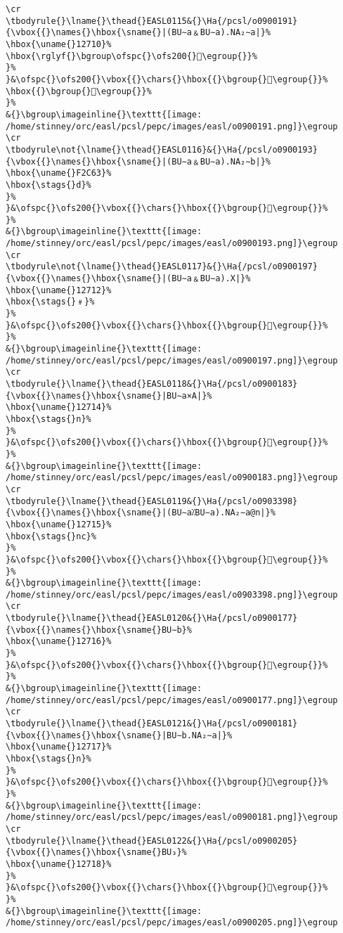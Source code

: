 \begin{verbatim}
\cr
\tbodyrule{}\lname{}\thead{}EASL0115&{}\Ha{/pcsl/o0900191}{\vbox{{}\names{}\hbox{\sname{}|(BU∼a﹠BU∼a).NA₂∼a|}%
\hbox{\uname{}12710}%
\hbox{\rglyf{}\bgroup\ofspc{}\ofs200{}𒜐\egroup{}}%
}%
}&\ofspc{}\ofs200{}\vbox{{}\chars{}\hbox{{}\bgroup{}𒜐\egroup{}}%
\hbox{{}\bgroup{}𒜑\egroup{}}%
}%
&{}\bgroup\imageinline{}\texttt{[image: /home/stinney/orc/easl/pcsl/pepc/images/easl/o0900191.png]}\egroup
\cr
\tbodyrule\not{\lname{}\thead{}EASL0116}&{}\Ha{/pcsl/o0900193}{\vbox{{}\names{}\hbox{\sname{}|(BU∼a﹠BU∼a).NA₂∼b|}%
\hbox{\uname{}F2C63}%
\hbox{\stags{}d}%
}%
}&\ofspc{}\ofs200{}\vbox{{}\chars{}\hbox{{}\bgroup{}󲱣\egroup{}}%
}%
&{}\bgroup\imageinline{}\texttt{[image: /home/stinney/orc/easl/pcsl/pepc/images/easl/o0900193.png]}\egroup
\cr
\tbodyrule\not{\lname{}\thead{}EASL0117}&{}\Ha{/pcsl/o0900197}{\vbox{{}\names{}\hbox{\sname{}|(BU∼a﹠BU∼a).X|}%
\hbox{\uname{}12712}%
\hbox{\stags{}﹟}%
}%
}&\ofspc{}\ofs200{}\vbox{{}\chars{}\hbox{{}\bgroup{}𒜒\egroup{}}%
}%
&{}\bgroup\imageinline{}\texttt{[image: /home/stinney/orc/easl/pcsl/pepc/images/easl/o0900197.png]}\egroup
\cr
\tbodyrule{}\lname{}\thead{}EASL0118&{}\Ha{/pcsl/o0900183}{\vbox{{}\names{}\hbox{\sname{}|BU∼a×A|}%
\hbox{\uname{}12714}%
\hbox{\stags{}n}%
}%
}&\ofspc{}\ofs200{}\vbox{{}\chars{}\hbox{{}\bgroup{}𒜔\egroup{}}%
}%
&{}\bgroup\imageinline{}\texttt{[image: /home/stinney/orc/easl/pcsl/pepc/images/easl/o0900183.png]}\egroup
\cr
\tbodyrule{}\lname{}\thead{}EASL0119&{}\Ha{/pcsl/o0903398}{\vbox{{}\names{}\hbox{\sname{}|(BU∼a⁒BU∼a).NA₂∼a@n|}%
\hbox{\uname{}12715}%
\hbox{\stags{}nc}%
}%
}&\ofspc{}\ofs200{}\vbox{{}\chars{}\hbox{{}\bgroup{}𒜕\egroup{}}%
}%
&{}\bgroup\imageinline{}\texttt{[image: /home/stinney/orc/easl/pcsl/pepc/images/easl/o0903398.png]}\egroup
\cr
\tbodyrule{}\lname{}\thead{}EASL0120&{}\Ha{/pcsl/o0900177}{\vbox{{}\names{}\hbox{\sname{}BU∼b}%
\hbox{\uname{}12716}%
}%
}&\ofspc{}\ofs200{}\vbox{{}\chars{}\hbox{{}\bgroup{}𒜖\egroup{}}%
}%
&{}\bgroup\imageinline{}\texttt{[image: /home/stinney/orc/easl/pcsl/pepc/images/easl/o0900177.png]}\egroup
\cr
\tbodyrule{}\lname{}\thead{}EASL0121&{}\Ha{/pcsl/o0900181}{\vbox{{}\names{}\hbox{\sname{}|BU∼b.NA₂∼a|}%
\hbox{\uname{}12717}%
\hbox{\stags{}n}%
}%
}&\ofspc{}\ofs200{}\vbox{{}\chars{}\hbox{{}\bgroup{}𒜗\egroup{}}%
}%
&{}\bgroup\imageinline{}\texttt{[image: /home/stinney/orc/easl/pcsl/pepc/images/easl/o0900181.png]}\egroup
\cr
\tbodyrule{}\lname{}\thead{}EASL0122&{}\Ha{/pcsl/o0900205}{\vbox{{}\names{}\hbox{\sname{}BU₃}%
\hbox{\uname{}12718}%
}%
}&\ofspc{}\ofs200{}\vbox{{}\chars{}\hbox{{}\bgroup{}𒜘\egroup{}}%
}%
&{}\bgroup\imageinline{}\texttt{[image: /home/stinney/orc/easl/pcsl/pepc/images/easl/o0900205.png]}\egroup

\end{verbatim}
